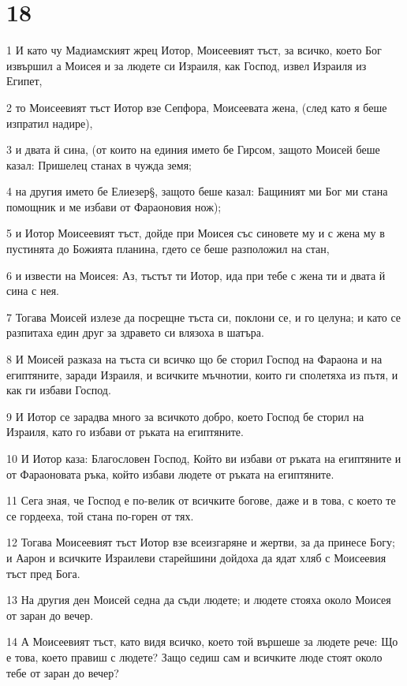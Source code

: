 \chapter{18}

\par 1 И като чу Мадиамският жрец Иотор, Моисеевият тъст, за всичко, което Бог извършил а Моисея и за людете си Израиля, как Господ, извел Израиля из Египет,
\par 2 то Моисеевият тъст Иотор взе Сепфора, Моисеевата жена, (след като я беше изпратил надире),
\par 3 и двата й сина, (от които на единия името бе Гирсом, защото Моисей беше казал: Пришелец станах в чужда земя;
\par 4 на другия името бе Елиезер§, защото беше казал: Бащиният ми Бог ми стана помощник и ме избави от Фараоновия нож);
\par 5 и Иотор Моисеевият тъст, дойде при Моисея със синовете му и с жена му в пустинята до Божията планина, гдето се беше разположил на стан,
\par 6 и извести на Моисея: Аз, тъстът ти Иотор, ида при тебе с жена ти и двата й сина с нея.
\par 7 Тогава Моисей излезе да посрещне тъста си, поклони се, и го целуна; и като се разпитаха един друг за здравето си влязоха в шатъра.
\par 8 И Моисей разказа на тъста си всичко що бе сторил Господ на Фараона и на египтяните, заради Израиля, и всичките мъчнотии, които ги сполетяха из пътя, и как ги избави Господ.
\par 9 И Иотор се зарадва много за всичкото добро, което Господ бе сторил на Израиля, като го избави от ръката на египтяните.
\par 10 И Иотор каза: Благословен Господ, Който ви избави от ръката на египтяните и от Фараоновата ръка, който избави людете от ръката на египтяните.
\par 11 Сега зная, че Господ е по-велик от всичките богове, даже и в това, с което те се гордееха, той стана по-горен от тях.
\par 12 Тогава Моисеевият тъст Иотор взе всеизгаряне и жертви, за да принесе Богу; и Аарон и всичките Израилеви старейшини дойдоха да ядат хляб с Моисеевия тъст пред Бога.
\par 13 На другия ден Моисей седна да съди людете; и людете стояха около Моисея от заран до вечер.
\par 14 А Моисеевият тъст, като видя всичко, което той вършеше за людете рече: Що е това, което правиш с людете? Защо седиш сам и всичките люде стоят около тебе от заран до вечер?
